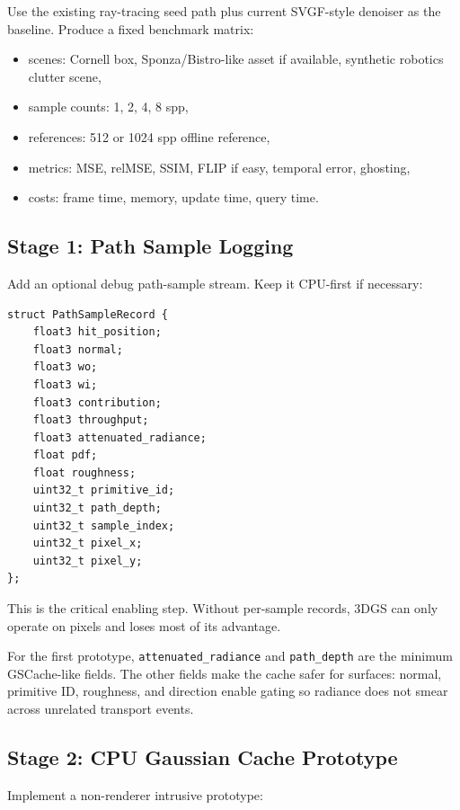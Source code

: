 \documentclass[11pt]{article}
\begin{document}
Use the existing ray-tracing seed path plus current SVGF-style denoiser as the
baseline. Produce a fixed benchmark matrix:

\begin{itemize}
  \item scenes: Cornell box, Sponza/Bistro-like asset if available, synthetic
        robotics clutter scene,
  \item sample counts: 1, 2, 4, 8 spp,
  \item references: 512 or 1024 spp offline reference,
  \item metrics: MSE, relMSE, SSIM, FLIP if easy, temporal error, ghosting,
  \item costs: frame time, memory, update time, query time.
\end{itemize}

\subsection{Stage 1: Path Sample Logging}

Add an optional debug path-sample stream. Keep it CPU-first if necessary:

\begin{verbatim}
struct PathSampleRecord {
    float3 hit_position;
    float3 normal;
    float3 wo;
    float3 wi;
    float3 contribution;
    float3 throughput;
    float3 attenuated_radiance;
    float pdf;
    float roughness;
    uint32_t primitive_id;
    uint32_t path_depth;
    uint32_t sample_index;
    uint32_t pixel_x;
    uint32_t pixel_y;
};
\end{verbatim}

This is the critical enabling step. Without per-sample records, 3DGS can only
operate on pixels and loses most of its advantage.

For the first prototype, \texttt{attenuated\_radiance} and
\texttt{path\_depth} are the minimum GSCache-like fields. The other fields make
the cache safer for surfaces: normal, primitive ID, roughness, and direction
enable gating so radiance does not smear across unrelated transport events.

\subsection{Stage 2: CPU Gaussian Cache Prototype}

Implement a non-renderer intrusive prototype:
\end{document}
